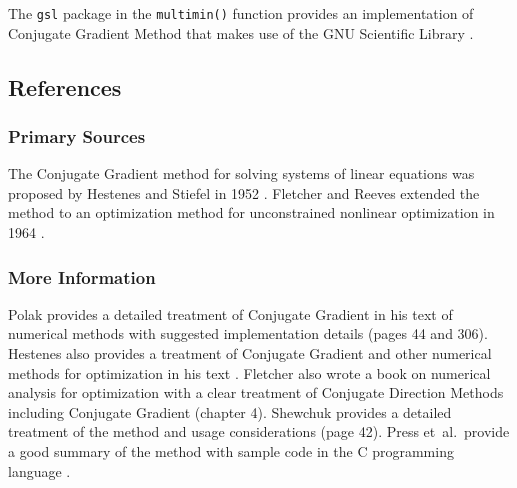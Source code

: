 The \texttt{gsl} package in the \texttt{multimin()} function provides an implementation of Conjugate Gradient Method that makes use of the GNU Scientific Library \cite{Hankin2011}.


\subsection{References}

\subsubsection{Primary Sources}
The Conjugate Gradient method for solving systems of linear equations was proposed by Hestenes and Stiefel in 1952 \cite{Hestenes1952}.
Fletcher and Reeves extended the method to an optimization method for unconstrained nonlinear optimization in 1964 \cite{Fletcher1964}.

\subsubsection{More Information}
Polak provides a detailed treatment of Conjugate Gradient in his text of numerical methods with suggested implementation details \cite{Polak1971} (pages 44 and 306).
Hestenes also provides a treatment of Conjugate Gradient and other numerical methods for optimization in his text \cite{Hestenes1980}.
Fletcher also wrote a book on numerical analysis for optimization with a clear treatment of Conjugate Direction Methods including Conjugate Gradient \cite{Fletcher2000} (chapter 4).
Shewchuk provides a detailed treatment of the method and usage considerations \cite{Shewchuk1994} (page 42).
Press et~al.\ provide a good summary of the method with sample code in the C programming language \cite{Press2007}.

